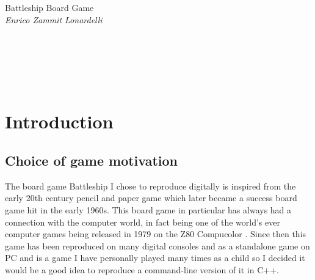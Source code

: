 \documentclass[11pt]{article} %
\begin{document}



\begin{center} %

{\Huge Battleship Board Game}\\[0.5cm] %
\vspace{5mm}
\textit{Enrico Zammit Lonardelli}
\\
\vspace{5mm}
\\
\vspace{5mm}
\\
\vspace{5mm}
\\
\vspace{5mm}
\\
\vspace{5mm}
\\
\end{center}
\vspace{10mm}
\section{Introduction}
\subsection{Choice of game motivation}
The board game Battleship I chose to reproduce digitally is inspired from the early 20th century pencil and paper game which later
became a success board game hit in the early 1960s.
This board game in particular has always had a connection with the computer world, in fact being one of the world's ever
computer games being released in 1979 on the Z80 Compucolor \cite{hinebaugh2009board}.
Since then this game has been reproduced on many digital consoles and as a standalone game on PC and is a game I have personally played many
times as a child so I decided it would be a good idea to reproduce a command-line version of it in C++.
\end{document}
